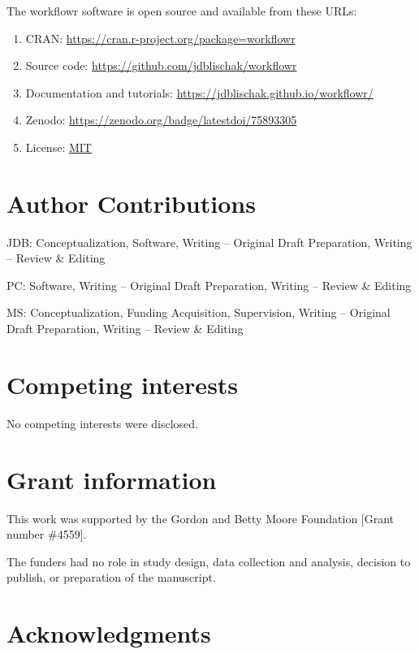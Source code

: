 \documentclass[9pt,a4paper]{extarticle}
\begin{document}
The workflowr software is open source and available from these URLs:

\begin{enumerate}

\item CRAN: \url{https://cran.r-project.org/package=workflowr}

\item Source code: \url{https://github.com/jdblischak/workflowr}

\item Documentation and tutorials:
\url{https://jdblischak.github.io/workflowr/}

\item Zenodo: \url{https://zenodo.org/badge/latestdoi/75893305}

\item License: \href{https://choosealicense.com/licenses/mit}{MIT}

\end{enumerate}


\section*{Author Contributions}

JDB: Conceptualization, Software, Writing – Original Draft Preparation,
Writing – Review \& Editing

PC: Software, Writing – Original Draft Preparation, Writing – Review \&
Editing

MS: Conceptualization, Funding Acquisition, Supervision, Writing –
Original Draft Preparation, Writing – Review \& Editing


\section*{Competing interests}

No competing interests were disclosed.


\section*{Grant information}

This work was supported by the Gordon and Betty Moore Foundation [Grant
number \#4559].

The funders had no role in study design, data collection and analysis,
decision to publish, or preparation of the manuscript.


\section*{Acknowledgments}
\end{document}
